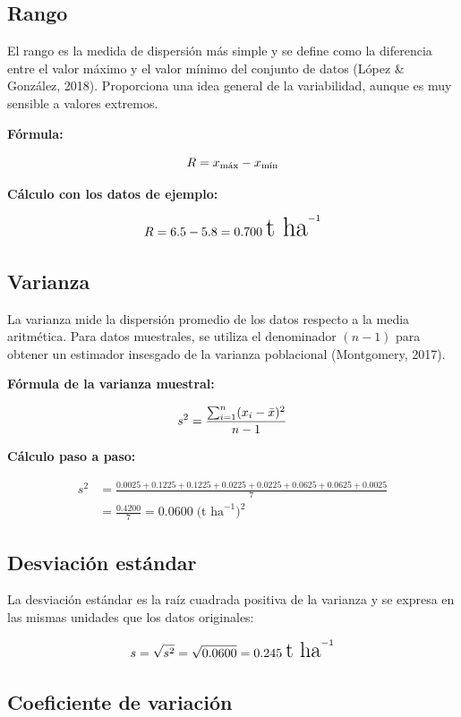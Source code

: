 \documentclass[
  spanish,
  letterpaper,
]{book}
\begin{document}
\subsection{Rango}\label{rango}

El rango es la medida de dispersión más simple y se define como la
diferencia entre el valor máximo y el valor mínimo del conjunto de datos
(López \& González, 2018). Proporciona una idea general de la
variabilidad, aunque es muy sensible a valores extremos.

\textbf{Fórmula:}

\[\huge R = x_{\text{máx}} - x_{\text{mín}}\]

\textbf{Cálculo con los datos de ejemplo:}

\[\huge R = 6.5 - 5.8 = 0.700\; \text{t ha}^{-1}\]

\subsection{Varianza}\label{varianza}

La varianza mide la dispersión promedio de los datos respecto a la media
aritmética. Para datos muestrales, se utiliza el denominador \((n-1)\)
para obtener un estimador insesgado de la varianza poblacional
(Montgomery, 2017).

\textbf{Fórmula de la varianza muestral:}

\[\huge s^2 = \frac{\sum_{i=1}^{n} (x_i - \bar{x})^2}{n-1}\]

\textbf{Cálculo paso a paso:}

\[\begin{aligned}
s^2 &=  \frac{0.0025 + 0.1225 + 0.1225 + 0.0225 + 0.0225 + 0.0625 + 0.0625 + 0.0025}{7} \\[4pt]
&= \frac{0.4200}{7} = 0.0600\; \text{(t ha}^{-1}\text{)}^2
\end{aligned}\]

\subsection{Desviación estándar}\label{desviaciuxf3n-estuxe1ndar}

La desviación estándar es la raíz cuadrada positiva de la varianza y se
expresa en las mismas unidades que los datos originales:

\[\LARGE s = \sqrt{s^2} = \sqrt{0.0600} = 0.245\; \text{t ha}^{-1}\]

\subsection{Coeficiente de variación}\label{coeficiente-de-variaciuxf3n}
\end{document}
